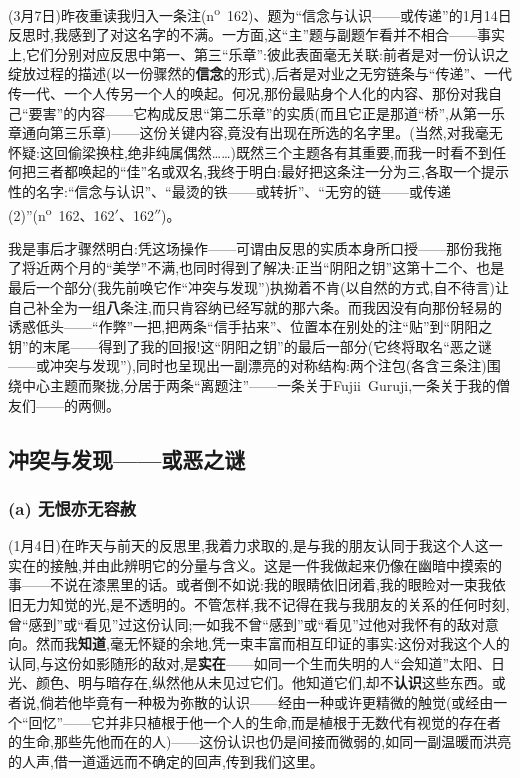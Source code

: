 (3月7日)昨夜重读我归入一条注(n\textsuperscript{o}~162)、题为“信念与认识——或传递”的1月14日反思时,我感到了对这名字的不满。一方面,这“主”题与副题乍看并不相合——事实上,它们分别对应反思中第一、第三“乐章”:彼此表面毫无关联:前者是对一份认识之绽放过程的描述(以一份骤然的\textbf{信念}的形式),后者是对业之无穷链条与“传递”、一代传一代、一个人传另一个人的唤起。何况,那份最贴身个人化的内容、那份对我自己“要害”的内容——它构成反思“第二乐章”的实质(而且它正是那道“桥”,从第一乐章通向第三乐章)——这份关键内容,竟没有出现在所选的名字里。(当然,对我毫无怀疑:这回偷梁换柱,绝非纯属偶然……)既然三个主题各有其重要,而我一时看不到任何把三者都唤起的“佳”名或双名,我终于\dmark{}明白:最好把这条注一分为三,各取一个提示性的名字:“信念与认识”、“最烫的铁——或转折”、“无穷的链——或传递(2)”(n\textsuperscript{o}~162、162$'$、162$''$)。

我是事后才骤然明白:凭这场操作——可谓由反思的实质本身所口授——那份我拖了将近两个月的“美学”不满,也同时得到了解决:正当“阴阳之钥”这第十二个、也是最后一个部分(我先前唤它作“冲突与发现”)执拗着不肯(以自然的方式,自不待言)让自己补全为一组\textbf{八}条注,而只肯容纳已经写就的那六条。而我因没有向那份轻易的诱惑低头——“作弊”一把,把两条“信手拈来”、位置本在别处的注“贴”到“阴阳之钥”的末尾——得到了我的回报!这“阴阳之钥”的最后一部分(它终将取名“恶之谜——或冲突与发现”),同时也呈现出一副漂亮的对称结构:两个注包(各含三条注)围绕中心主题而聚拢,分居于两条“离题注”——一条关于Fujii~Guruji,一条关于我的僧友们——的两侧。

\subsection{冲突与发现——或恶之谜}
\label{ch18:local:h70}

\subsubsection*{(a) 无恨亦无容赦}
\label{ch18:local:h71}

\label{ch18:local:n66}

(1月4日)在昨天与前天的反思里,我着力求取的,是与我的朋友认同于我这个人这一实在的接触,并由此辨明它的分量与含义。这是一件我做起来仍像在幽暗中摸索的事——不说在漆黑里的话。或者倒不如说:我的眼睛依旧闭着,我的眼睑对一束我依旧无力知觉的光,是不透明的。不管怎样,我不记得在我与我朋友的关系的任何时刻,曾“感到”或“看见”过这份认同;一如我不曾“感到”或“看见”过他对我怀有的敌对意向。然而我\textbf{知道},毫无怀疑的余地,凭一束丰富而相互印证的事实:这份对我这个人的认同,与这份如影随形的敌对,是\textbf{实在}——如同一个生而失明的人“会知道”太阳、日光、颜色、明与暗存在,纵然他从未见过它们。他知道它们,却不\textbf{认识}这些东西。或者说,倘若他毕竟有一种极为弥散的认识——经由一种或许更精微的触觉(或经由一个“回忆”——它并非只植根于他一个人的生命,而是植根于无数代有视觉的存在者\dmark{}的生命,那些先他而在的人)——这份认识也仍是间接而微弱的,如同一副温暖而洪亮的人声,借一道遥远而不确定的回声,传到我们这里。

